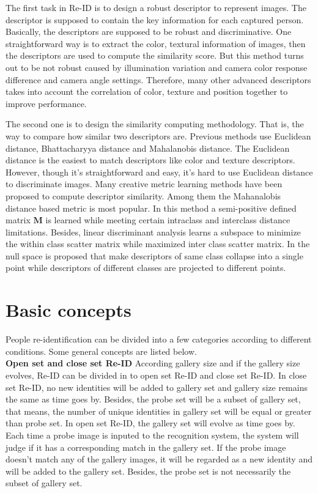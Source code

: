 The first task in Re-ID is to design a robust descriptor to represent images. The descriptor is supposed to contain the key information for each captured person. Basically, the descriptors are supposed to be robust and discriminative. One straightforward way is to extract the color, textural information of images, then the descriptors are used to compute the similarity score. But this method turns out to be not robust caused by illumination variation  and camera color response difference and camera angle settings.  Therefore, many other advanced descriptors takes into account the correlation of color, texture and position together to improve performance.


The second one is to design the similarity computing methodology. That is, the way to compare how similar two descriptors are. Previous methods use Euclidean distance, Bhattacharyya distance and Mahalanobis distance. The Euclidean distance is the easiest to match descriptors like color and texture descriptors. However, though it's straightforward and easy, it's hard to use Euclidean distance to discriminate images. 
Many creative metric learning methods have been proposed to compute descriptor similarity. Among them the Mahanalobis distance based metric is most popular. In this method a semi-positive defined matrix $\bm{M}$ is learned while meeting certain intraclass and interclass distance limitations. Besides, linear discriminant analysis \cite{LFDA} learns a subspace to minimize the within class scatter matrix while maximized inter class scatter matrix. In \cite{NFST} the null space is proposed that make descriptors of same class collapse into a single point while descriptors of different classes are projected to different points. 
	
\section{Basic concepts}
People re-identification can be divided into a few categories according to different conditions. Some general concepts are listed below.\\
\indent \textbf{Open set and close set Re-ID} \cite{REIDsurvey} According gallery size and if the gallery size evolves, Re-ID can be divided in to open set Re-ID and close set Re-ID. In close set Re-ID, no new identities will be added to gallery set and gallery size remains the same as time goes by. Besides, the probe set will be a subset of gallery set, that means, the number of unique identities in gallery set will be equal or greater than probe set. In open set Re-ID, the gallery set will evolve as time goes by. Each time a probe image is inputed to the recognition system, the system will judge if it has a corresponding match in the gallery set. If the probe image doesn't match any of the gallery images, it will be regarded as a new identity and will be added to the gallery set. Besides, the probe set is not necessarily the subset of gallery set. 

